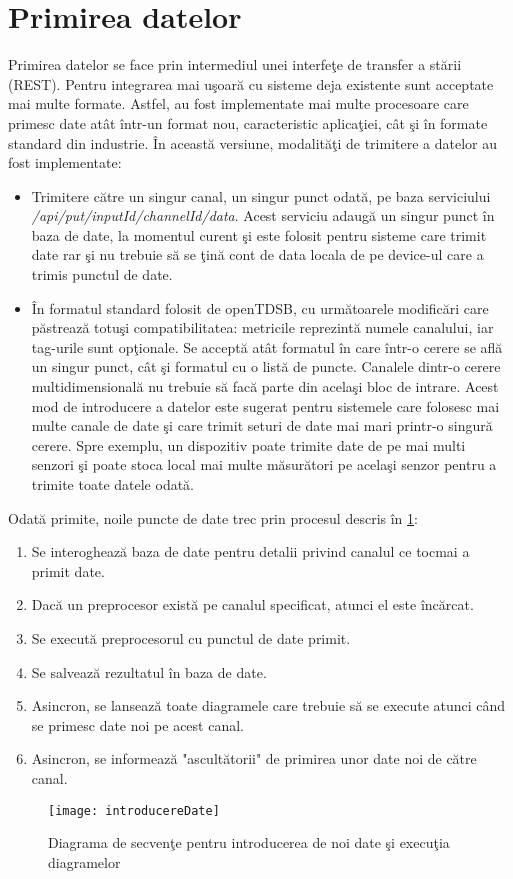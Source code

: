 \section{Primirea datelor}
Primirea datelor se face prin intermediul unei interfeţe de transfer a stării (REST). Pentru integrarea mai uşoară cu sisteme deja existente sunt acceptate mai multe formate. Astfel, au fost implementate mai multe procesoare care primesc date atât într-un format nou, caracteristic aplicaţiei, cât şi în formate standard din industrie.
În această versiune, modalităţi de trimitere a datelor au fost implementate:
\begin{itemize}
	\item Trimitere către un singur canal, un singur punct odată, pe baza serviciului\\ \textit{/api/put/{inputId}/{channelId}/{data}}. Acest serviciu adaugă un singur punct în baza de date, la momentul curent şi este folosit pentru sisteme care trimit date rar şi nu trebuie să se ţină cont de data locala de pe device-ul care a trimis punctul de date.
	\item În formatul standard folosit de openTDSB, cu următoarele modificări care păstrează totuşi compatibilitatea: metricile reprezintă numele canalului, iar tag-urile sunt opţionale. Se acceptă atât formatul în care într-o cerere se află un singur punct, cât şi formatul cu o listă de puncte. Canalele dintr-o cerere multidimensională nu trebuie să facă parte din acelaşi bloc de intrare. Acest mod de introducere a datelor este sugerat pentru sistemele care folosesc mai multe canale de date şi care trimit seturi de date mai mari printr-o singură cerere. Spre exemplu, un dispozitiv poate trimite date de pe mai multi senzori şi poate stoca local mai multe măsurători pe acelaşi senzor pentru a trimite toate datele odată.
\end{itemize}
Odată primite, noile puncte de date trec prin procesul descris în \cref{fig:intrareDate}:
\begin{enumerate}
	\item Se interoghează baza de date pentru detalii privind canalul ce tocmai a primit date.
	\item Dacă un preprocesor există pe canalul specificat, atunci el este încărcat.
	\item Se execută preprocesorul cu punctul de date primit.
	\item Se salvează rezultatul în baza de date.
	\item Asincron, se lansează toate diagramele care trebuie să se execute atunci când se primesc date noi pe acest canal.
	\item Asincron, se informează "ascultătorii" de primirea unor date noi de către canal.
\end{enumerate}
\begin{landscape}
	\begin{figure}
		\centering
		\texttt{[image: introducereDate]}
		\caption{Diagrama de secvenţe pentru introducerea de noi date şi execuţia diagramelor}
		\label{fig:intrareDate}
	\end{figure}
\end{landscape}